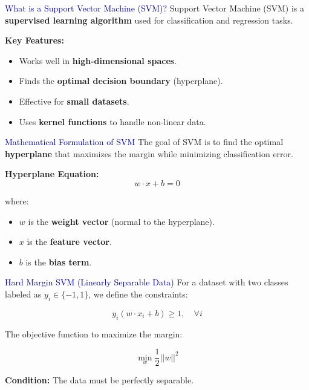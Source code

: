 \begin{frame}{\textcolor{darkblue}{What is a Support Vector Machine (SVM)?}}
    Support Vector Machine (SVM) is a \textbf{supervised learning algorithm} used for classification and regression tasks.

    \vspace{0.3cm}
    \textbf{Key Features:}
    \begin{itemize}
        \item Works well in \textbf{high-dimensional spaces}.
        \item Finds the \textbf{optimal decision boundary} (hyperplane).
        \item Effective for \textbf{small datasets}.
        \item Uses \textbf{kernel functions} to handle non-linear data.
    \end{itemize}
\end{frame}

\begin{frame}{\textcolor{darkblue}{Mathematical Formulation of SVM}}
    The goal of SVM is to find the optimal \textbf{hyperplane} that maximizes the margin while minimizing classification error.

    \textbf{Hyperplane Equation:}
    \[
    w \cdot x + b = 0
    \]
    
    where:
    \begin{itemize}
        \item $w$ is the \textbf{weight vector} (normal to the hyperplane).
        \item $x$ is the \textbf{feature vector}.
        \item $b$ is the \textbf{bias term}.
    \end{itemize}
\end{frame}

\begin{frame}{\textcolor{darkblue}{Hard Margin SVM (Linearly Separable Data)}}
    For a dataset with two classes labeled as $ y_i \in \{-1,1\} $, we define the constraints:

    \[
    y_i (w \cdot x_i + b) \geq 1, \quad \forall i
    \]

    The objective function to maximize the margin:

    \[
    \min_{w} \frac{1}{2} ||w||^2
    \]

    \textbf{Condition:} The data must be perfectly separable.
\end{frame}

